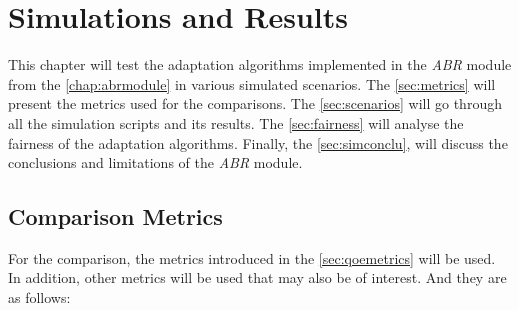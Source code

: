 \chapter{Simulations and Results}
\label{chap:scenarios} 

This chapter will test the adaptation algorithms implemented in the \textit{ABR}
module from the \autoref{chap:abrmodule} in various simulated scenarios. The \autoref{sec:metrics}
will present the metrics used for the comparisons. The \autoref{sec:scenarios} will 
go through all the simulation scripts and its results. The \autoref{sec:fairness} will
analyse the fairness of the adaptation algorithms. Finally, the \autoref{sec:simconclu},
will discuss the conclusions and limitations of the \textit{ABR} module.


\section{Comparison Metrics}
\label{sec:metrics}

For the comparison, the metrics introduced in the \autoref{sec:qoemetrics} will be used.
In addition, other metrics will be used that may also be of interest. And they are as follows:

